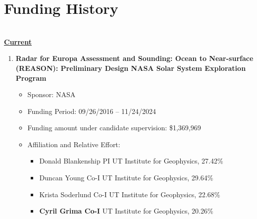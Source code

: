 \section*{Funding History}

\textbf{\ul{\\ Current}}

\begin{enumerate}[leftmargin=2.5em, labelsep=1.5em, label=C\arabic*]

    \item
        \textbf{Radar for Europa Assessment and Sounding: Ocean to Near-surface (REASON): Preliminary Design NASA Solar System Exploration Program}
        \begin{itemize}[leftmargin=0em, labelsep=1em, topsep=-.5em, itemsep=-.2em]
            \item Sponsor: NASA
            \item Funding Period: 09/26/2016 – 11/24/2024
            \item Funding amount under candidate supervision: \$1,369,969
            \item Affiliation and Relative Effort:
            \TabPositions{4cm, 5.5cm}
            \begin{itemize}[leftmargin=2em, labelsep=1em, topsep=-.5em, itemsep=-.2em]
                \item Donald Blankenship \tab PI \tab UT Institute for Geophysics, 27.42\%
                \item Duncan Young \tab Co-I \tab  UT Institute for Geophysics, 29.64\%
                \item Krista Soderlund \tab Co-I \tab  UT Institute for Geophysics, 22.68\% 
                \item \textbf{Cyril Grima \tab Co-I} \tab  UT Institute for Geophysics, 20.26\%
            \end{itemize}
        \end{itemize}


\end{enumerate}
